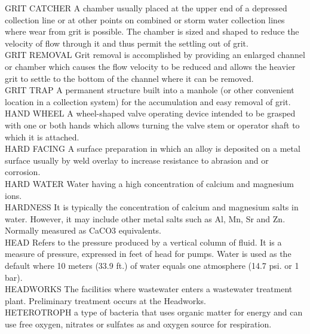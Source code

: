 GRIT CATCHER
A chamber usually placed at the upper end of a depressed collection line or at other points on combined or storm water collection lines where wear from grit is possible. The chamber is sized and shaped to reduce the velocity of flow through it and thus permit the settling out of grit. 
\vspace{0.3cm}\\
GRIT REMOVAL
Grit removal is accomplished by providing an enlarged channel or chamber which causes the flow velocity to be reduced and allows the heavier grit to settle to the bottom of the channel where it can be removed.
\vspace{0.3cm}\\
GRIT TRAP
A permanent structure built into a manhole (or other convenient location in a collection system) for the accumulation and easy removal of grit. 
\vspace{0.3cm}\\
HAND WHEEL
A wheel-shaped valve operating device intended to be grasped with one or both hands which allows turning the valve stem or operator shaft to which it is attached.
\vspace{0.3cm}\\
HARD FACING
A surface preparation in which an alloy is deposited on a metal surface usually by weld overlay to increase resistance to abrasion and or corrosion.
\vspace{0.3cm}\\
HARD WATER
Water having a high concentration of calcium and magnesium ions.
\vspace{0.3cm}\\
HARDNESS
It is typically the concentration of calcium and magnesium salts in water. However, it may include other metal salts such as Al, Mn, Sr and Zn. Normally measured as CaCO3 equivalents.
\vspace{0.3cm}\\
HEAD
Refers to the pressure produced by a vertical column of fluid.  It is a measure of pressure, expressed in feet of head for pumps. Water is used as the default where 10 meters (33.9 ft.) of water equals one atmosphere (14.7 psi. or 1 bar).
\vspace{0.3cm}\\
HEADWORKS
The facilities where wastewater enters a wastewater treatment plant. Preliminary treatment occurs at the Headworks.
\vspace{0.3cm}\\
HETEROTROPH
a type of bacteria that uses organic matter for energy and can use free oxygen, nitrates or sulfates as and oxygen source for respiration.
